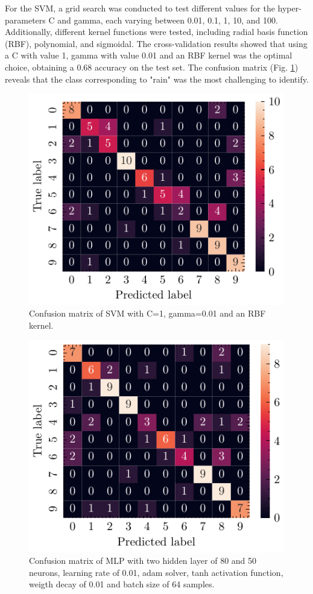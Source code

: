 \documentclass[journal]{IEEEtran}
\begin{document}
For the SVM, a grid search was conducted to test different values for the hyper-parameters C and gamma, each varying between 0.01, 0.1, 1, 10, and 100. Additionally, different kernel functions were tested, including radial basis function (RBF), polynomial, and sigmoidal.
The cross-validation results showed that using a C with value 1, gamma with value 0.01 and an RBF kernel was the optimal choice, obtaining a 0.68 accuracy on the test set. The confusion matrix (Fig. \ref{fig:svm_confusion_matrix}) reveals that the class corresponding to "rain" was the most challenging to identify.
\begin{figure}[ht]
    \centering
    \includegraphics[width=\linewidth]{confusion_matrix_svm.pdf}
    \caption{Confusion matrix of SVM with C=1, gamma=0.01 and an RBF kernel.}
    \label{fig:svm_confusion_matrix}
\end{figure}
\begin{figure}[ht]
    \centering
    \includegraphics[width=\linewidth]{confusion_matrix_mlp.pdf}
    \caption{Confusion matrix of MLP with two hidden layer of 80 and 50 neurons, learning rate of 0.01, adam solver, tanh activation function, weigth decay of 0.01 and batch size of 64 samples.}
    \label{fig:mlp_confusion_matrix}
\end{figure}
\end{document}
